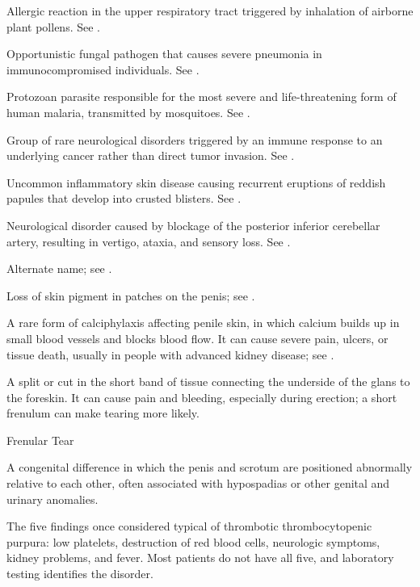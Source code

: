  Allergic reaction in the upper respiratory tract triggered by inhalation of airborne plant pollens. See .

 Opportunistic fungal pathogen that causes severe pneumonia in immunocompromised individuals. See .

 Protozoan parasite responsible for the most severe and life-threatening form of human malaria, transmitted by mosquitoes. See .

 Group of rare neurological disorders triggered by an immune response to an underlying cancer rather than direct tumor invasion. See .

 Uncommon inflammatory skin disease causing recurrent eruptions of reddish papules that develop into crusted blisters. See .

 Neurological disorder caused by blockage of the posterior inferior cerebellar artery, resulting in vertigo, ataxia, and sensory loss. See .

 Alternate name; see .

 Loss of skin pigment in patches on the penis; see .

 A rare form of calciphylaxis affecting penile skin, in which calcium builds up in small blood vessels and blocks blood flow. It can cause severe pain, ulcers, or tissue death, usually in people with advanced kidney disease; see .

 A split or cut in the short band of tissue connecting the underside of the glans to the foreskin. It can cause pain and bleeding, especially during erection; a short frenulum can make tearing more likely.

\synonyms
Frenular Tear

 A congenital difference in which the penis and scrotum are positioned abnormally relative to each other, often associated with hypospadias or other genital and urinary anomalies.

 The five findings once considered typical of thrombotic thrombocytopenic purpura: low platelets, destruction of red blood cells, neurologic symptoms, kidney problems, and fever. Most patients do not have all five, and laboratory testing identifies the disorder.

